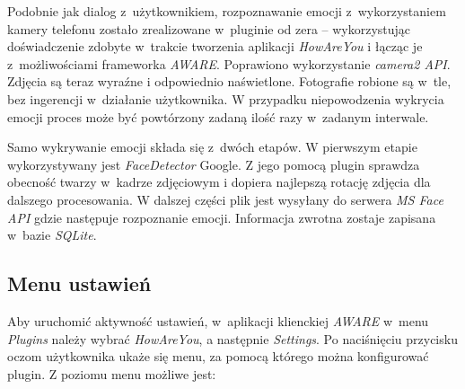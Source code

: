 Podobnie jak dialog z~użytkownikiem, rozpoznawanie emocji z~wykorzystaniem kamery telefonu zostało zrealizowane w~pluginie od zera -- wykorzystując doświadczenie zdobyte w~trakcie tworzenia aplikacji \textit{HowAreYou} i łącząc je z~możliwościami frameworka \textit{AWARE}. Poprawiono wykorzystanie \textit{camera2 API}. Zdjęcia są teraz wyraźne i odpowiednio naświetlone. Fotografie robione są w~tle, bez ingerencji w~działanie użytkownika. W przypadku niepowodzenia wykrycia emocji proces może być powtórzony zadaną ilość razy w~zadanym interwale.

Samo wykrywanie emocji składa się z~dwóch etapów. W pierwszym etapie wykorzystywany jest \textit{FaceDetector} Google. Z jego pomocą plugin sprawdza obecność twarzy w~kadrze zdjęciowym i dopiera najlepszą rotację zdjęcia dla dalszego procesowania. W dalszej części plik jest wysyłany do serwera \textit{MS Face API} gdzie następuje rozpoznanie emocji. Informacja zwrotna zostaje zapisana w~bazie \textit{SQLite}.


\subsection{Menu ustawień}


Aby uruchomić aktywność ustawień, w~aplikacji klienckiej \textit{AWARE} w~menu \textit{Plugins} należy wybrać \textit{HowAreYou}, a następnie \textit{Settings}. Po naciśnięciu przycisku oczom użytkownika ukaże się menu, za pomocą którego można konfigurować plugin. Z poziomu menu możliwe jest:

